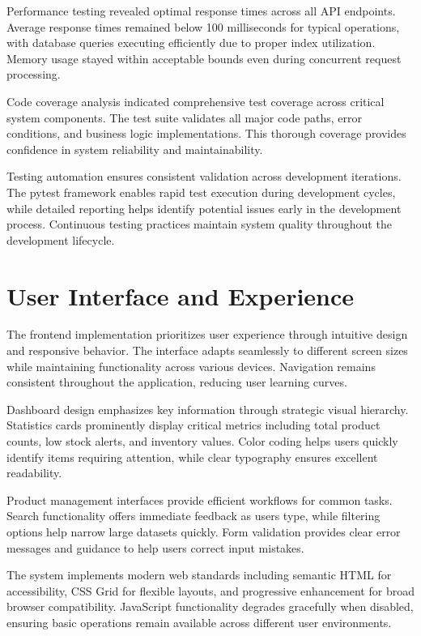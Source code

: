 \documentclass[12pt,a4paper]{article}
\begin{document}
Performance testing revealed optimal response times across all API endpoints. Average response times remained below 100 milliseconds for typical operations, with database queries executing efficiently due to proper index utilization. Memory usage stayed within acceptable bounds even during concurrent request processing.

Code coverage analysis indicated comprehensive test coverage across critical system components. The test suite validates all major code paths, error conditions, and business logic implementations. This thorough coverage provides confidence in system reliability and maintainability.

Testing automation ensures consistent validation across development iterations. The pytest framework enables rapid test execution during development cycles, while detailed reporting helps identify potential issues early in the development process. Continuous testing practices maintain system quality throughout the development lifecycle.

\section{User Interface and Experience}

The frontend implementation prioritizes user experience through intuitive design and responsive behavior. The interface adapts seamlessly to different screen sizes while maintaining functionality across various devices. Navigation remains consistent throughout the application, reducing user learning curves.

Dashboard design emphasizes key information through strategic visual hierarchy. Statistics cards prominently display critical metrics including total product counts, low stock alerts, and inventory values. Color coding helps users quickly identify items requiring attention, while clear typography ensures excellent readability.

Product management interfaces provide efficient workflows for common tasks. Search functionality offers immediate feedback as users type, while filtering options help narrow large datasets quickly. Form validation provides clear error messages and guidance to help users correct input mistakes.

The system implements modern web standards including semantic HTML for accessibility, CSS Grid for flexible layouts, and progressive enhancement for broad browser compatibility. JavaScript functionality degrades gracefully when disabled, ensuring basic operations remain available across different user environments.
\end{document}
